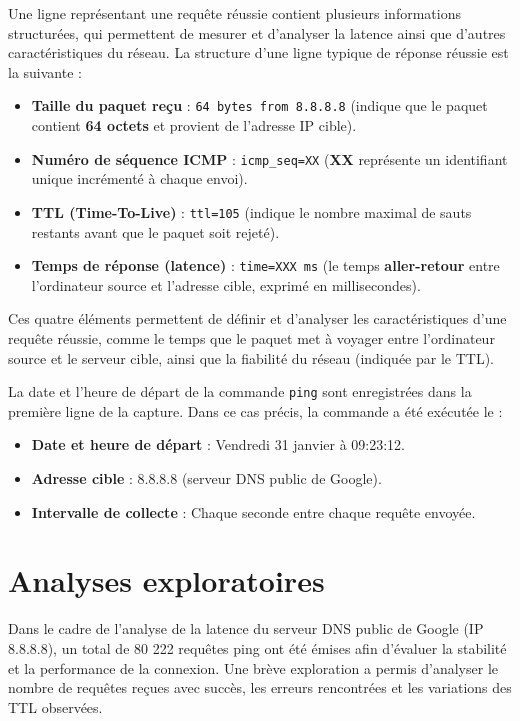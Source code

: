 Une ligne représentant une requête réussie contient plusieurs informations structurées, qui permettent de mesurer et d'analyser la latence ainsi que d'autres caractéristiques du réseau. La structure d'une ligne typique de réponse réussie est la suivante :

\begin{itemize}
	\item \textbf{Taille du paquet reçu} : \texttt{64 bytes from 8.8.8.8} (indique que le paquet contient \textbf{64 octets} et provient de l'adresse IP cible).
	\item \textbf{Numéro de séquence ICMP} : \texttt{icmp\_seq=XX} (\textbf{XX} représente un identifiant unique incrémenté à chaque envoi).
	\item \textbf{TTL (Time-To-Live)} : \texttt{ttl=105} (indique le nombre maximal de sauts restants avant que le paquet soit rejeté).
	\item \textbf{Temps de réponse (latence)} : \texttt{time=XXX ms} (le temps \textbf{aller-retour} entre l'ordinateur source et l'adresse cible, exprimé en millisecondes).
\end{itemize}

Ces quatre éléments permettent de définir et d'analyser les caractéristiques d'une requête réussie, comme le temps que le paquet met à voyager entre l'ordinateur source et le serveur cible, ainsi que la fiabilité du réseau (indiquée par le TTL).

La date et l'heure de départ de la commande \texttt{ping} sont enregistrées dans la première ligne de la capture. Dans ce cas précis, la commande a été exécutée le :

\begin{itemize}
	\item \textbf{Date et heure de départ} : Vendredi 31 janvier à 09:23:12.
	\item \textbf{Adresse cible} : 8.8.8.8 (serveur DNS public de Google).
	\item \textbf{Intervalle de collecte} : Chaque seconde entre chaque requête envoyée.
\end{itemize}

\section{Analyses exploratoires}
Dans le cadre de l’analyse de la latence du serveur DNS public de Google (IP 8.8.8.8), un total de 80 222 requêtes ping ont été émises afin d’évaluer la stabilité et la performance de la connexion. Une brève exploration  a permis d’analyser le nombre de requêtes reçues avec succès, les erreurs rencontrées et les variations des TTL observées.

